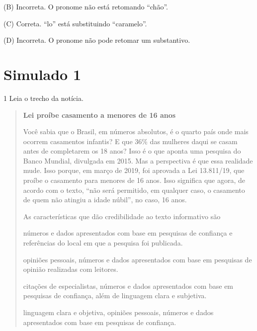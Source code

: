 \begin{escolha}
(B) Incorreta. O pronome não está retomando ``chão''.

(C) Correta. ``lo'' está substituindo ``caramelo''.

(D) Incorreta. O pronome não pode retomar um substantivo.

\chapter{Simulado 1}

\num{1} Leia o trecho da notícia.


\begin{quote}
\textbf{Lei proíbe casamento a menores de 16 anos}

Você sabia que o Brasil, em números absolutos, é o quarto país onde mais
ocorrem casamentos infantis? E que 36\% das mulheres daqui se casam
antes de completarem os 18 anos? Isso é o que aponta uma pesquisa do
Banco Mundial, divulgada em 2015. Mas a perspectiva é que essa realidade
mude. Isso porque, em março de 2019, foi aprovada a Lei 13.811/19, que
proíbe o casamento para menores de 16 anos. Isso significa que agora, de
acordo com o texto, ``não será permitido, em qualquer caso, o casamento
de quem não atingiu a idade núbil'', no caso, 16 anos.


As características que dão credibilidade ao texto informativo são

\begin{escolha}
\item números e dados apresentados com base em pesquisas de confiança e
referências do local em que a pesquisa foi publicada.

\item opiniões pessoais, números e dados apresentados com base em
pesquisas de opinião realizadas com leitores.

\item citações de especialistas, números e dados apresentados com base em
pesquisas de confiança, além de linguagem clara e subjetiva.

\item linguagem clara e objetiva, opiniões pessoais, números e dados
apresentados com base em pesquisas de confiança.
\end{escolha}


\end{quote}
\end{escolha}
